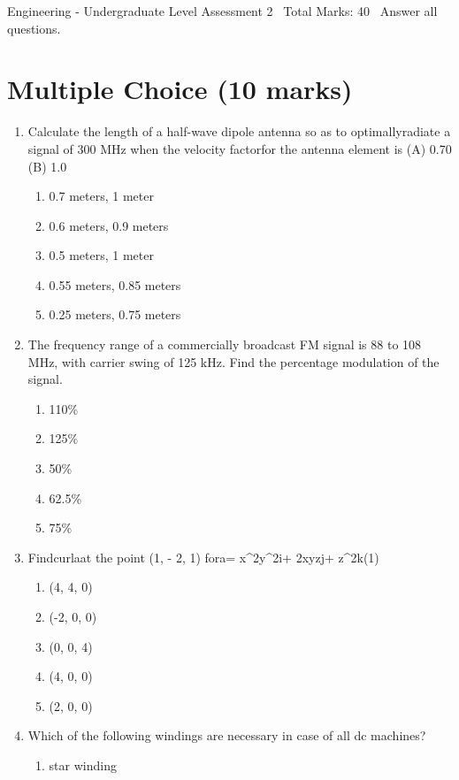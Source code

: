 \documentclass[12pt]{article}
\begin{document}
\begin{center}
Engineering - Undergraduate Level Assessment 2 \
Total Marks: 40 \
Answer all questions.
\end{center}

\section*{Multiple Choice (10 marks)}
\begin{enumerate}[label=\arabic*.]
\item Calculate the length of a half-wave dipole antenna so as to optimallyradiate a signal of
300 MHz when the velocity factorfor the antenna element is (A) 0.70 (B) 1.0
\begin{enumerate}[label=(\alph*)]
    \item 0.7 meters, 1 meter
    \item 0.6 meters, 0.9 meters
    \item 0.5 meters, 1 meter
    \item 0.55 meters, 0.85 meters
    \item 0.25 meters, 0.75 meters
\end{enumerate}
\item The frequency range of a commercially broadcast FM signal is 88 to 108 MHz, with carrier
swing of 125 kHz. Find the percentage modulation of the signal.
\begin{enumerate}[label=(\alph*)]
    \item 110\%
    \item 125\%
    \item 50\%
    \item 62.5\%
    \item 75\%
\end{enumerate}
\item Findcurlaat the point (1, - 2, 1) fora= x\^{}2y\^{}2i+ 2xyzj+ z\^{}2k(1)
\begin{enumerate}[label=(\alph*)]
    \item (4, 4, 0)
    \item (-2, 0, 0)
    \item (0, 0, 4)
    \item (4, 0, 0)
    \item (2, 0, 0)
\end{enumerate}
\item Which of the following windings are necessary in case of all dc machines?
\begin{enumerate}[label=(\alph*)]
    \item star winding

\end{enumerate}
\end{enumerate}
\end{document}
